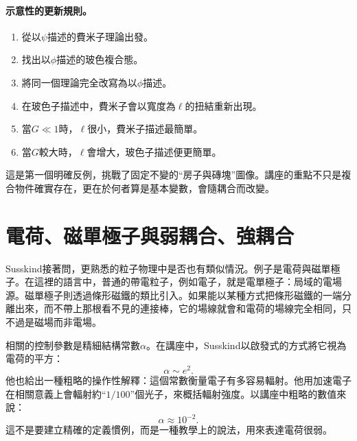 \paragraph{示意性的更新規則。}
\begin{enumerate}
\item 從以\(\psi\)描述的費米子理論出發。
\item 找出以\(\phi\)描述的玻色複合態。
\item 將同一個理論完全改寫為以\(\phi\)描述。
\item 在玻色子描述中，費米子會以寬度為\(\ell\)的扭結重新出現。
\item 當\(G\ll 1\)時，\(\ell\)很小，費米子描述最簡單。
\item 當\(G\)較大時，\(\ell\)會增大，玻色子描述便更簡單。
\end{enumerate}

這是第一個明確反例，挑戰了固定不變的``房子與磚塊''圖像。講座的重點不只是複合物件確實存在，更在於何者算是基本變數，會隨耦合而改變。

\section{電荷、磁單極子與弱耦合、強耦合}

Susskind接著問，更熟悉的粒子物理中是否也有類似情況。例子是電荷與磁單極子。在這裡的語言中，普通的帶電粒子，例如電子，就是電單極子：局域的電場源。磁單極子則透過條形磁鐵的類比引入。如果能以某種方式把條形磁鐵的一端分離出來，而不帶上那根看不見的連接棒，它的場線就會和電荷的場線完全相同，只不過是磁場而非電場。

相關的控制參數是精細結構常數\(\alpha\)。在講座中，Susskind以啟發式的方式將它視為電荷的平方：
\begin{equation}
\alpha \sim e^2.
\end{equation}
他也給出一種粗略的操作性解釋：這個常數衡量電子有多容易輻射。他用加速電子在相關意義上會輻射約``\(1/100\)''個光子，來概括輻射強度。以講座中粗略的數值來說：
\begin{equation}
\alpha \approx 10^{-2}.
\end{equation}
這不是要建立精確的定義慣例，而是一種教學上的說法，用來表達電荷很弱。


